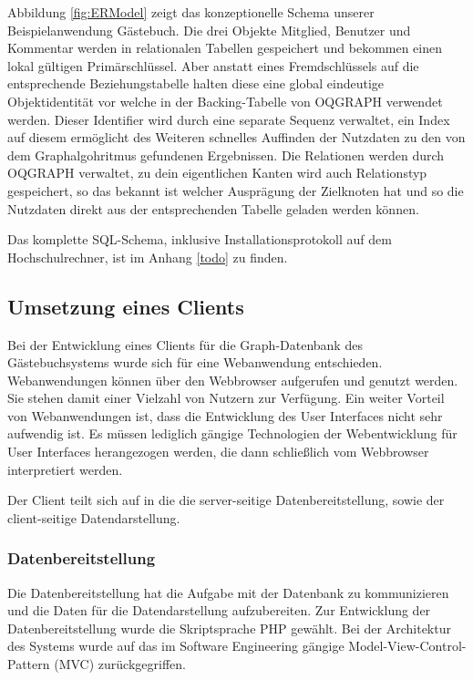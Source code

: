 Abbildung \ref{fig:ERModel} zeigt das konzeptionelle Schema unserer Beispielanwendung Gästebuch. Die drei Objekte Mitglied, Benutzer und Kommentar werden in relationalen Tabellen gespeichert und bekommen einen lokal gültigen Primärschlüssel. Aber anstatt eines Fremdschlüssels auf die entsprechende Beziehungstabelle halten diese eine global eindeutige Objektidentität vor welche in der Backing-Tabelle von OQGRAPH verwendet werden. Dieser Identifier wird durch eine separate Sequenz verwaltet, ein Index auf diesem ermöglicht des Weiteren schnelles Auffinden der Nutzdaten zu den von dem Graphalgohritmus gefundenen Ergebnissen. Die Relationen werden durch OQGRAPH verwaltet, zu dein eigentlichen Kanten wird auch Relationstyp gespeichert, so das bekannt ist welcher Ausprägung der Zielknoten hat und so die Nutzdaten direkt aus der entsprechenden Tabelle geladen werden können.

Das komplette SQL-Schema, inklusive Installationsprotokoll auf dem Hochschulrechner, ist im Anhang \ref{todo} zu finden.

\subsection{Umsetzung eines Clients}
Bei der Entwicklung eines Clients für die Graph-Datenbank des Gästebuchsystems wurde sich für eine Webanwendung entschieden. Webanwendungen können über den Webbrowser aufgerufen und genutzt werden. Sie stehen damit einer Vielzahl von Nutzern zur Verfügung. Ein weiter Vorteil von Webanwendungen ist, dass die Entwicklung des User Interfaces nicht sehr aufwendig ist. Es müssen lediglich gängige Technologien der Webentwicklung für User Interfaces herangezogen werden, die dann schließlich vom Webbrowser interpretiert werden.

Der Client teilt sich auf in die die server-seitige Datenbereitstellung, sowie der client-seitige Datendarstellung.

\subsubsection{Datenbereitstellung}
Die Datenbereitstellung hat die Aufgabe mit der Datenbank zu kommunizieren und die Daten für die Datendarstellung aufzubereiten. Zur Entwicklung der Datenbereitstellung wurde die Skriptsprache PHP gewählt. Bei der Architektur des Systems wurde auf das im Software Engineering gängige Model-View-Control-Pattern (MVC) zurückgegriffen.

